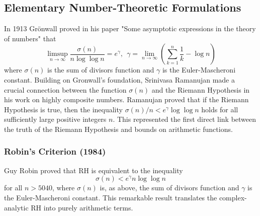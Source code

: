 \documentclass{article}
\begin{document}
\subsection{Elementary Number-Theoretic Formulations}

In 1913 Grönwall proved in his paper "Some asymptotic expressions in the theory of numbers" that $$\limsup _{n \rightarrow \infty} \frac{\sigma(n)}{n \log \log n}=e^\gamma, \  \ \gamma=\lim _{n \rightarrow \infty}\left(\sum_{k=1}^n \frac{1}{k}-\log n\right)$$ where $\sigma(n)$ is the sum of divisors function and $\gamma$ is the Euler-Mascheroni constant. Building on Gronwall's foundation, Srinivasa Ramanujan made a crucial connection between the  function $\sigma(n)$ and the Riemann Hypothesis in his work on highly composite numbers. Ramanujan proved that if the Riemann Hypothesis is true, then the inequality $\sigma(n) / n<e^\gamma \log \log n$ holds for all sufficiently large positive integers $n$. This represented the first direct link between the truth of the Riemann Hypothesis and bounds on arithmetic functions.

\subsubsection{Robin's Criterion (1984)} Guy Robin proved that RH is equivalent to the inequality
$$\sigma(n) < e^\gamma n \log \log n$$
for all $n > 5040$, where $\sigma(n)$ is, as above, the sum of divisors function and $\gamma$ is the Euler-Mascheroni constant. This remarkable result translates the complex-analytic RH into purely arithmetic terms.
\end{document}
